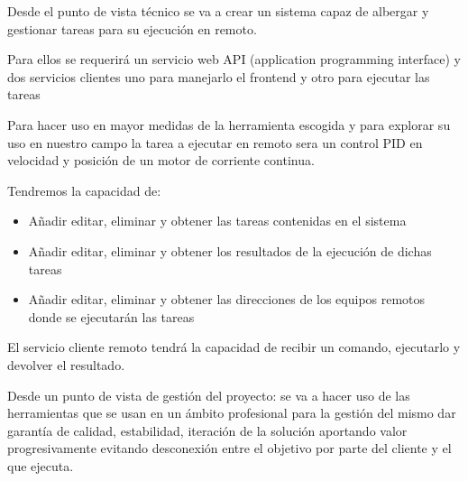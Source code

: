 Desde el punto de vista técnico se va a crear un sistema capaz de albergar y gestionar tareas para su ejecución en remoto.

Para ellos se requerirá un servicio web API (application programming interface) y dos servicios clientes uno para manejarlo el frontend y otro para ejecutar las tareas

Para hacer uso en mayor medidas de la herramienta escogida y para explorar su uso en nuestro campo la tarea a ejecutar en remoto sera un control PID en velocidad y posición de un motor de corriente continua.

Tendremos la capacidad de:

\begin{itemize}
	\item Añadir editar, eliminar y obtener las tareas contenidas en el sistema
	\item Añadir editar, eliminar y obtener los resultados de la ejecución de dichas tareas
	\item Añadir editar, eliminar y obtener las direcciones de los equipos remotos donde se ejecutarán las tareas
\end{itemize} 

El servicio cliente remoto tendrá la capacidad de recibir un comando, ejecutarlo y devolver el resultado.

Desde un punto de vista de gestión del proyecto: se va a hacer uso de las herramientas que se usan en un ámbito profesional para la gestión del mismo dar garantía de calidad, estabilidad, iteración de la solución aportando valor progresivamente evitando desconexión entre el objetivo por parte del cliente y el que ejecuta.